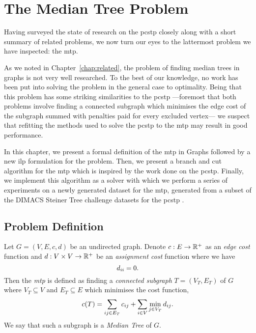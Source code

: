\chapter{The Median Tree Problem}\label{chap:mediantree}
Having surveyed the state of research on the \gls{pcstp} closely along with a
short summary of related problems, we now turn our eyes to the lattermost problem
we have inspected: the \gls{mtp}.

As we noted in Chapter~\ref{chap:related},
the problem of finding median trees
in graphs is not very well researched. To the best of our knowledge, no work has been put into solving
the problem in the general case to optimality.
Being that this problem has some striking similarities
to the \gls{pcstp} ---foremost that both problems involve finding a connected
subgraph which minimises the edge cost of the subgraph summed with
penalties paid for every excluded vertex--- we suspect that refitting the
methods used to solve the \gls{pcstp} to the \gls{mtp} may result in good performance.

In this chapter, we present a formal definition of the \acrlong{mtp} in Graphs
followed by a new \gls{ilp} formulation for the problem.
Then, we present a branch and cut algorithm for the \gls{mtp} which is inspired by the
work done on the \gls{pcstp}. Finally, we implement this algorithm as a solver with which
we perform a series of experiments on a newly generated dataset
for the \gls{mtp}, generated from a subset
of the DIMACS Steiner Tree challenge datasets for the \gls{pcstp} \citep{DIMACS}.
 
\section{Problem Definition}

Let $G = (V, E, c, d)$ be an undirected graph. Denote $c : E \to \mathbb{R}^+$ as an \textit{edge cost} function
and $d : V \times V  \to \mathbb{R}^+$ be an \textit{assignment cost} function where we have
\[d_{ii} = 0 \mathnormal{.}\]
Then the \textit{\acrlong{mtp}}
is defined as finding a \textit{connected subgraph} $T = (V_T, E_T)$ of $G$
where $V_T \subseteq V$ and
$E_T \subseteq E$ which minimises the cost function,
\[c(T) = \sum_{ij \in E_T} c_{ij} + \sum_{i \in V} \min_{j \in V_T} d_{ij}\mathnormal{.}\]
We say that such a subgraph is a \textit{Median Tree} of $G$.

